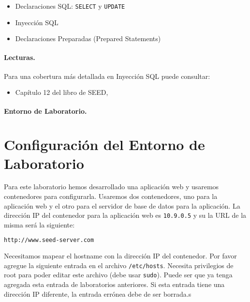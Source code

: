 \begin{itemize}[noitemsep]
\item Declaraciones SQL: \texttt{SELECT} y \texttt{UPDATE}
\item Inyección SQL
\item Declaraciones Preparadas (Prepared Statements)
\end{itemize}



\paragraph{Lecturas.}
Para una cobertura más detallada en Inyección SQL puede consultar:

\begin{itemize}
\item Capítulo 12 del libro de SEED, \seedbook
\end{itemize}

\paragraph{Entorno de Laboratorio.} 
\seedenvironmentB 
\nodependency


\section{Configuración del Entorno de Laboratorio}

Para este laboratorio hemos desarrollado una aplicación web y usaremos contenedores para configurarla. Usaremos dos contenedores, uno para la aplicación web y el otro para el servidor de base de datos para la aplicación.
La dirección IP del contenedor para la aplicación web es \texttt{10.9.0.5} y su la URL de la misma será la siguiente:

\begin{lstlisting}
http://www.seed-server.com
\end{lstlisting}

Necesitamos mapear el hostname con la dirección IP del contenedor. Por favor agregue la siguiente entrada en el archivo  \texttt{/etc/hosts}. Necesita privilegios de root para poder editar este archivo (debe usar \texttt{sudo}).
Puede ser que ya tenga agregada esta entrada de laboratorios anteriores. Si esta entrada tiene una dirección IP diferente, la entrada errónea debe de ser borrada.s

